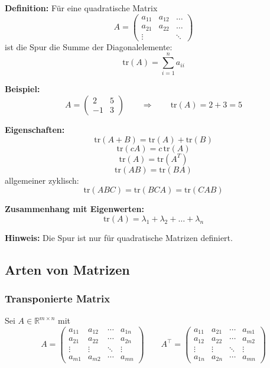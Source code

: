 \documentclass[9pt,a4paper]{article}
\begin{document}
    \textbf{Definition:} Für eine quadratische Matrix
    \[
    A=\begin{pmatrix}
        a_{11} & a_{12} & \dots \\
        a_{21} & a_{22} & \dots \\
        \vdots & & \ddots
    \end{pmatrix}
    \]
    ist die Spur die Summe der Diagonalelemente:
    \[
    \mathrm{tr}(A)=\sum_{i=1}^{n} a_{ii}
    \]
    
    \textbf{Beispiel:}
    \[
    A=\begin{pmatrix}
        2 & 5\\
        -1 & 3
    \end{pmatrix}
    \qquad\Rightarrow\qquad
    \mathrm{tr}(A)=2+3=5
    \]
    
    \textbf{Eigenschaften:}
    \[
    \mathrm{tr}(A+B)=\mathrm{tr}(A)+\mathrm{tr}(B)
    \]
    \[
    \mathrm{tr}(cA)=c\,\mathrm{tr}(A)
    \]
    \[
    \mathrm{tr}(A)=\mathrm{tr}(A^T)
    \]
    \[
    \mathrm{tr}(AB)=\mathrm{tr}(BA)
    \]
    allgemeiner zyklisch:
    \[
    \mathrm{tr}(ABC)=\mathrm{tr}(BCA)=\mathrm{tr}(CAB)
    \]
    
    \textbf{Zusammenhang mit Eigenwerten:}
    \[
    \mathrm{tr}(A)=\lambda_1+\lambda_2+\dots+\lambda_n
    \]
    
    \textbf{Hinweis:} Die Spur ist nur für quadratische Matrizen definiert.
    
    \subsection{Arten von Matrizen}
    \subsubsection{Transponierte Matrix}
    
    Sei $A \in \mathbb{R}^{m \times n}$ mit
    \[
    A=\begin{pmatrix}
        a_{11}&a_{12}&\cdots&a_{1n}\\
        a_{21}&a_{22}&\cdots&a_{2n}\\
        \vdots&\vdots&\ddots&\vdots\\
        a_{m1}&a_{m2}&\cdots&a_{mn}
    \end{pmatrix}
    \qquad
    A^\top=\begin{pmatrix}
        a_{11}&a_{21}&\cdots&a_{m1}\\
        a_{12}&a_{22}&\cdots&a_{m2}\\
        \vdots&\vdots&\ddots&\vdots\\
        a_{1n}&a_{2n}&\cdots&a_{mn}
    \end{pmatrix}
    \]
    
\end{document}
